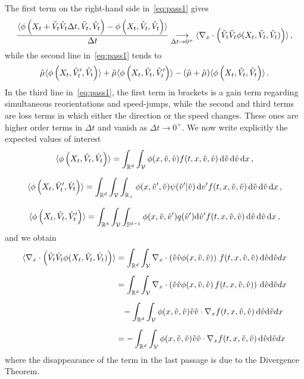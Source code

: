 \documentclass[a4paper]{article}
\theoremstyle{Theorem}\newtheorem{proposition}{Proposition}[section]
\theoremstyle{Remark}\newtheorem{remark}{Remark}[section]
\theoremstyle{Theorem}\newtheorem{theorem}{Theorem}[section]
\DeclarePairedDelimiter\ave{\langle}{\rangle}
\newcommand{\R}{\mathbb{R}}
\newcommand{\hv}{\hat{v}}
\newcommand{\tv}{\tilde{v}}
\newcommand{\hV}{\hat{V}}
\newcommand{\tV}{\tilde{V}}
\newcommand{\hmu}{\hat{\mu}}
\newcommand{\tmu}{\tilde{\mu}}
\newcommand{\intS}{\int_{\mathbb{S}^{d-1}}}
\newcommand{\intR}{\int_{\R_+}}
\newcommand{\intV}{\int_{\mathcal{V}}}
\begin{document}
The first term on the right-hand side in~\eqref{eq:pass1} gives
\[
\frac{\ave{\phi\left(X_{t}+ \tV_t\hV_t\Delta t,\tV_{t},\hV_t\right)-\phi\left(X_t, \tV_t,\hV_t\right)}}{\Delta{t}}\underset{\Delta{t}\to 0^+}{\longrightarrow}\ave{\nabla_{x}\cdot \left( \tV_t\hV_t\phi(X_t, \tV_t,\hV_t)\right)}\,,
\]
while the second line in~\eqref{eq:pass1} tends to
\[
 \tmu \ave{\phi\left(X_{t},\tV_{t}' ,\hV_{t} \right)}+ \hmu\ave{\phi\left(X_{t},\tV_{t} ,\hV_{t}' \right)}-( \tmu+\hmu)\ave{\phi\left(X_{t},\tV_{t} ,\hV_{t} \right)}\,.
\]
In the third line in~\eqref{eq:pass1}, the first term in brackets is a gain term regarding simultaneous reorientations and speed-jumps, while the second and third terms are loss terms in which either the direction or the speed changes. These ones are higher order terms in $\Delta t$ and vanish as $\Delta t \to 0^+$.
We now write explicitly the expected values of interest 
\[
\ave{\phi\left(X_{t},\tV_{t} ,\hV_{t} \right)} = \int_{\R^d}\int_\mathcal{V} \phi(x,\tv,\hv) f(t,x,\tv,\hv) \, {\rm d}\tv \, {\rm d}\hv \, {\rm d}x\,,
\]

\[
\ave{\phi\left(X_{t},\tV_{t}' ,\hV_{t} \right)} = \int_{\R^d}\int_\mathcal{V} \intR\phi(x,\tv',\hv) \psi(\tv'|\hv) \, {\rm d}v'f(t,x,\tv,\hv) \, {\rm d}\tv \, {\rm d}\hv \, {\rm d}x\,,
\]

\[
\ave{\phi\left(X_{t},\tV_{t} ,\hV_{t}' \right)} = \int_{\R^d}\int_\mathcal{V} \intS\phi(x,\tv,\hv') q(\hv') {\rm d}\hv' f(t,x,\tv,\hv) \, {\rm d}\tv \, {\rm d}\hv \, {\rm d}x\,,
\]
and we obtain
\begin{equation*}%
\begin{aligned}[b]
\langle\nabla_{x}\cdot \left( \tV_t\hV_t\phi(X_t, \tV_t,\hV_t)\right)\rangle&=\int_{\R^d}\intV \nabla_x \cdot \left( \tv\hv \phi(x,\tv,\hv)\right)\, f(t,x,\tv,\hv) \, {\rm d}\hv {\rm d}\tv  dx\\[0.2cm]
&=\int_{\R^d}\intV\nabla_x \cdot \left( \tv\hv \phi(x,\tv,\hv)\, f(t,x,\tv,\hv)\right) \, {\rm d}\hv {\rm d}\tv dx\\[0.2cm]
&\phantom{=}-\int_{\R^d} \intV\phi(x,\tv,\hv) \tv \hv \cdot \nabla_x  f(t,x,\tv,\hv) \, {\rm d}\hv {\rm d}\tv dx\\[0.2cm]
&=-\int_{\R^d}\intV\phi(x,\tv,\hv) \tv \hv \cdot \nabla_x  f(t,x,\tv,\hv) \, {\rm d}\hv {\rm d}\tv dx
\end{aligned}
\end{equation*}
where the disappearance of the term in the last passage is due to the Divergence Theorem.


\end{document}
